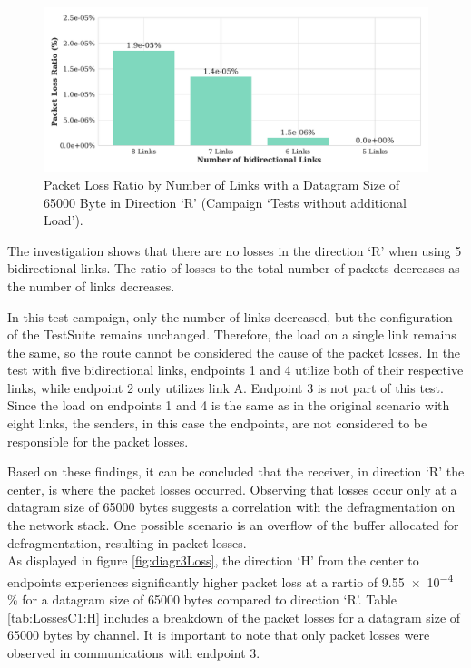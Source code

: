 \begin{figure}[h!]
    \centering
    \includegraphics[width=1\linewidth]{figures/reliability/ihawk/diagr5.pdf}
    \caption{Packet Loss Ratio by Number of Links with a Datagram Size of 65000 Byte in Direction `R' (Campaign `Tests without additional Load').}
    \label{fig:diagr5Loss}
\end{figure}

The investigation shows that there are no losses in the direction `R' when using 5 bidirectional links. The ratio of losses to the total number of packets decreases as the number of links decreases.

In this test campaign, only the number of links decreased, but the configuration of the TestSuite remains unchanged. Therefore, the load on a single link remains the same, so the route cannot be considered the cause of the packet losses. In the test with five bidirectional links, endpoints 1 and 4 utilize both of their respective links, while endpoint 2 only utilizes link A. Endpoint 3 is not part of this test. Since the load on endpoints 1 and 4 is the same as in the original scenario with eight links, the senders, in this case the endpoints, are not considered to be responsible for the packet losses.

Based on these findings, it can be concluded that the receiver, in direction `R' the center, is where the packet losses occurred. Observing that losses occur only at a datagram size of 65000 bytes suggests a correlation with the defragmentation on the network stack. One possible scenario is an overflow of the buffer allocated for defragmentation, resulting in packet losses. \\


As displayed in figure \ref{fig:diagr3Loss}, the direction `H' from the center to endpoints experiences significantly higher packet loss at a rartio of \num{9.55e-4} \% for a datagram size of 65000 bytes compared to direction `R'. Table \ref{tab:LossesC1:H} includes a breakdown of the packet losses for a datagram size of 65000 bytes by channel. It is important to note that only packet losses were observed in communications with endpoint 3.

